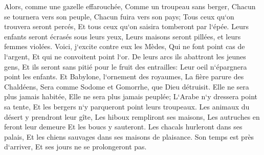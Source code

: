 \verse Alors, comme une gazelle effarouchée, Comme un troupeau sans berger, Chacun se tournera vers son peuple, Chacun fuira vers son pays; 
\verse Tous ceux qu`on trouvera seront percés, Et tous ceux qu`on saisira tomberont par l`épée. 
\verse Leurs enfants seront écrasés sous leurs yeux, Leurs maisons seront pillées, et leurs femmes violées. 
\verse Voici, j`excite contre eux les Mèdes, Qui ne font point cas de l`argent, Et qui ne convoitent point l`or. 
\verse De leurs arcs ils abattront les jeunes gens, Et ils seront sans pitié pour le fruit des entrailles: Leur oeil n`épargnera point les enfants. 
\verse Et Babylone, l`ornement des royaumes, La fière parure des Chaldéens, Sera comme Sodome et Gomorrhe, que Dieu détruisit. 
\verse Elle ne sera plus jamais habitée, Elle ne sera plus jamais peuplée; L`Arabe n`y dressera point sa tente, Et les bergers n`y parqueront point leurs troupeaux. 
\verse Les animaux du désert y prendront leur gîte, Les hiboux rempliront ses maisons, Les autruches en feront leur demeure Et les boucs y sauteront. 
\verse Les chacals hurleront dans ses palais, Et les chiens sauvages dans ses maisons de plaisance. Son temps est près d`arriver, Et ses jours ne se prolongeront pas. 

